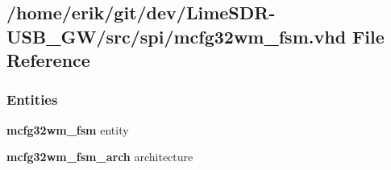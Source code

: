 \subsection{/home/erik/git/dev/\+Lime\+S\+D\+R-\/\+U\+S\+B\+\_\+\+G\+W/src/spi/mcfg32wm\+\_\+fsm.vhd File Reference}
\label{mcfg32wm__fsm_8vhd}
\subsubsection*{Entities}
\begin{DoxyCompactItemize}
\item 
{\bf mcfg32wm\+\_\+fsm} entity
\item 
{\bf mcfg32wm\+\_\+fsm\+\_\+arch} architecture
\end{DoxyCompactItemize}
